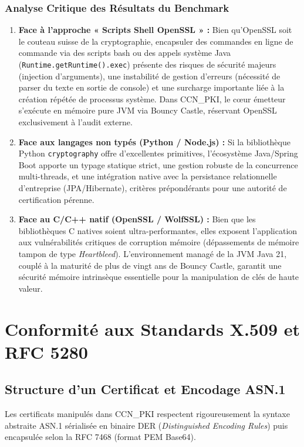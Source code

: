 \documentclass[12pt,a4paper]{report}
\begin{document}
\subsection{Analyse Critique des Résultats du Benchmark}
\begin{enumerate}
    \item \textbf{Face à l'approche « Scripts Shell OpenSSL » :} Bien qu'OpenSSL soit le couteau suisse de la cryptographie, encapsuler des commandes en ligne de commande via des scripts bash ou des appels système Java (\texttt{Runtime.getRuntime().exec}) présente des risques de sécurité majeurs (injection d'arguments), une instabilité de gestion d'erreurs (nécessité de parser du texte en sortie de console) et une surcharge importante liée à la création répétée de processus système. Dans CCN\_PKI, le cœur émetteur s'exécute en mémoire pure JVM via Bouncy Castle, réservant OpenSSL exclusivement à l'audit externe.
    \item \textbf{Face aux langages non typés (Python / Node.js) :} Si la bibliothèque Python \texttt{cryptography} offre d'excellentes primitives, l'écosystème Java/Spring Boot apporte un typage statique strict, une gestion robuste de la concurrence multi-threads, et une intégration native avec la persistance relationnelle d'entreprise (JPA/Hibernate), critères prépondérants pour une autorité de certification pérenne.
    \item \textbf{Face au C/C++ natif (OpenSSL / WolfSSL) :} Bien que les bibliothèques C natives soient ultra-performantes, elles exposent l'application aux vulnérabilités critiques de corruption mémoire (dépassements de mémoire tampon de type \textit{Heartbleed}). L'environnement managé de la JVM Java 21, couplé à la maturité de plus de vingt ans de Bouncy Castle, garantit une sécurité mémoire intrinsèque essentielle pour la manipulation de clés de haute valeur.
\end{enumerate}

\chapter{Conformité aux Standards X.509 et RFC 5280}

\section{Structure d'un Certificat et Encodage ASN.1}
Les certificats manipulés dans CCN\_PKI respectent rigoureusement la syntaxe abstraite ASN.1 sérialisée en binaire DER (\textit{Distinguished Encoding Rules}) puis encapsulée selon la RFC 7468 (format PEM Base64). 
\end{document}
